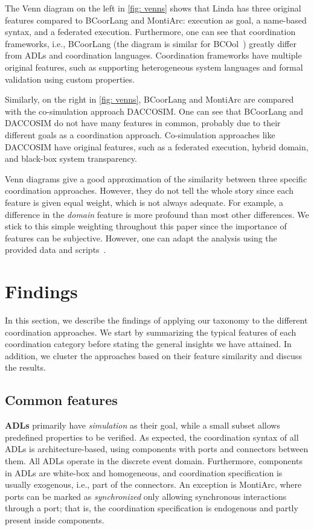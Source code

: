 \documentclass[runningheads]{llncs}
\begin{document}
The Venn diagram on the left in \autoref{fig: venns} shows that Linda has three original features compared to BCoorLang and MontiArc:
execution as goal, a name-based syntax, and a federated execution.
Furthermore, one can see that coordination frameworks, i.e., BCoorLang (the diagram is similar for BCOol~\cite{varalarsenBehavioralCoordinationOperator2015,varalarsenBCOolBehavioralCoordination2016}) greatly differ from ADLs and coordination languages.
Coordination frameworks have multiple original features, such as supporting heterogeneous system languages and formal validation using custom properties.

Similarly, on the right in \autoref{fig: venns}, BCoorLang and MontiArc are compared with the co-simulation approach DACCOSIM.
One can see that BCoorLang and DACCOSIM do not have many features in common, probably due to their different goals as a coordination approach.
Co-simulation approaches like DACCOSIM have original features, such as a federated execution, hybrid domain, and black-box system transparency.

Venn diagrams give a good approximation of the similarity between three specific coordination approaches.
However, they do not tell the whole story since each feature is given equal weight, which is not always adequate.
For example, a difference in the \textit{domain} feature is more profound than most other differences.
We stick to this simple weighting throughout this paper since the importance of features can be subjective.
However, one can adapt the analysis using the provided data and scripts~\cite{timkrauterArtifactsCoordination2024}.

\section{Findings} \label{sec: findings}

In this section, we describe the findings of applying our taxonomy to the different coordination approaches.
We start by summarizing the typical features of each coordination category before stating the general insights we have attained.
In addition, we cluster the approaches based on their feature similarity and discuss the results.

\subsection{Common features}

\textbf{ADLs} primarily have \textit{simulation} as their goal, while a small subset allows predefined properties to be verified.
As expected, the coordination syntax of all ADLs is architecture-based, using components with ports and connectors between them.
All ADLs operate in the discrete event domain.
Furthermore, components in ADLs are white-box and homogeneous, and coordination specification is usually exogenous, i.e., part of the connectors.
An exception is MontiArc, where ports can be marked as \textit{synchronized} only allowing synchronous interactions through a port; that is, the coordination specification is endogenous and partly present inside components.
\end{document}
